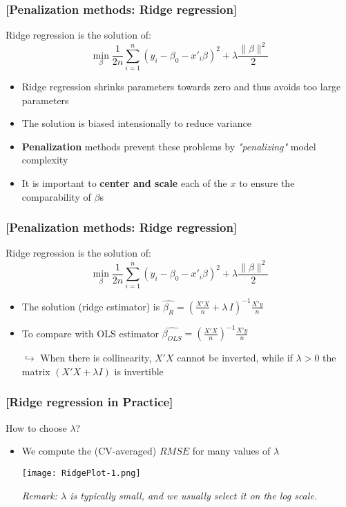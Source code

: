 \documentclass[xcolor=x11names,compress, handhouts]{beamer}
\renewcommand{\(}{\begin{columns}}
\renewcommand{\)}{\end{columns}}
\newcommand{\<}[1]{\begin{column}{#1}}
\renewcommand{\>}{\end{column}}
\begin{document}
\begin{frame} %
\frametitle{\textcolor{brique}{[Penalization methods: Ridge regression]}}
Ridge regression is  the solution of:
$$
\min_{\beta} \frac{1}{2n}
\sum_{i=1}^{n}{ \left( y_i - \beta_0 - x'_i\beta\right)^{2} } +
\lambda \frac{\| \beta\|^{2}}{2}
$$
\pause
\begin{itemize}[<+->]
\item Ridge regression shrinks parameters towards zero and thus avoids too large parameters
\item The solution is biased intensionally to reduce variance
\item \textbf{Penalization} methods prevent these problems by \emph{"penalizing"} model complexity
\item It is important to \textbf{center and scale}  each of the $x$ to ensure the comparability of $\beta$s
\end{itemize}
\end{frame}


\begin{frame} %
\frametitle{\textcolor{brique}{[Penalization methods: Ridge regression]}}
Ridge regression is  the solution of:
$$
\min_{\beta} \frac{1}{2n}
\sum_{i=1}^{n}{ \left( y_i - \beta_0 - x'_i\beta\right)^{2} } +
\lambda \frac{\| \beta\|^{2}}{2}
$$
\pause
\begin{itemize}[<+->]
\item The solution (ridge estimator) is $\widehat{\beta_R} = \left( \frac{X'X}{n} + \lambda \, I \right)^{-1} \frac{X' y}{n}$
\item To compare with OLS estimator  $ \widehat{\beta_{OLS}} = \left( \frac{X'X}{n}\right)^{-1} \frac{X' y}{n} $
\item[$\hookrightarrow$] When there is collinearity, $X'X$ cannot be inverted, while if $\lambda >0$ the matrix $ \left( X'X + \lambda I \right)$ is invertible
\end{itemize}
\end{frame}

\begin{frame} %
\frametitle{\textcolor{brique}{[Ridge regression in Practice]}}
How to choose $\lambda$?
\pause
\begin{itemize}[<+->]
\item We compute the (CV-averaged) $RMSE$ for many values of $\lambda$
\item[]  \texttt{[image: RidgePlot-1.png]}
\item[]\emph{Remark: $\lambda$ is typically small, and we usually select it on the log scale.}
\end{itemize}
\end{frame}
\end{document}
